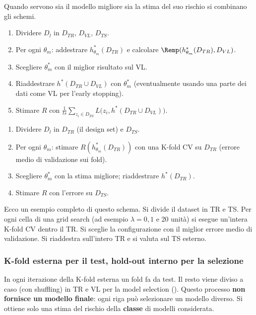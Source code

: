 Quando servono sia il modello migliore sia la stima del suo rischio si combinano gli schemi.

\begin{algoritmo}
\begin{enumerate}
  \item Dividere $D_l$ in $D_{TR}$, $D_{VL}$, $D_{TS}$.
  \item Per ogni $\theta_m$: addestrare $h^*_{\theta_m}(D_{TR})$ e calcolare $\Remp(h^*_{\theta_m}(D_{TR}),D_{VL})$.
  \item Scegliere $\theta^*_m$ con il miglior risultato sul VL.
  \item Riaddestrare $h^*(D_{TR}\cup D_{VL})$ con $\theta^*_m$ (eventualmente usando una parte dei dati come VL
        per l'early stopping).
  \item Stimare $R$ con $\frac{1}{ts}\sum_{z_i\in D_{TS}}L\big(z_i,h^*(D_{TR}\cup D_{VL})\big)$.
\end{enumerate}
\end{algoritmo}

\begin{algoritmo}
\begin{enumerate}
  \item Dividere $D_l$ in $D_{TR}$ (il design set) e $D_{TS}$.
  \item Per ogni $\theta_m$: stimare $R(h^*_{\theta_m}(D_{TR}))$ con una K-fold CV su $D_{TR}$ (errore medio di
        validazione sui fold).
  \item Scegliere $\theta^*_m$ con la stima migliore; riaddestrare $h^*(D_{TR})$.
  \item Stimare $R$ con l'errore su $D_{TS}$.
\end{enumerate}
\end{algoritmo}

Ecco un esempio completo di questo schema. Si divide il dataset in TR e TS. Per ogni cella di una grid search
(ad esempio $\lambda=0{,}1$ e 20 unità) si esegue un'intera K-fold CV dentro il TR. Si sceglie la configurazione
con il miglior errore medio di validazione. Si riaddestra sull'intero TR e si valuta sul TS esterno.

\subsubsection{K-fold esterna per il test, hold-out interno per la selezione}
In ogni iterazione della K-fold esterna un fold fa da test. Il resto viene diviso a caso (con shuffling) in TR e
VL per la model selection (). Questo processo \textbf{non fornisce un modello finale}:
ogni riga può selezionare un modello diverso. Si ottiene solo una stima del rischio della \textbf{classe} di
modelli considerata.

